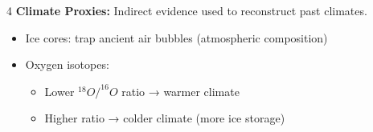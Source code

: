\documentclass[10pt]{article}
\begin{document}
\begin{multicols}{4}
\textbf{Climate Proxies:}
Indirect evidence used to reconstruct past climates.
\begin{itemize}
\item Ice cores: trap ancient air bubbles (atmospheric composition)
\item Oxygen isotopes:
\begin{itemize}
\item Lower $^{18}O/^{16}O$ ratio → warmer climate
\item Higher ratio → colder climate (more ice storage)
\end{itemize}
\end{itemize}

\end{multicols}
\end{document}
